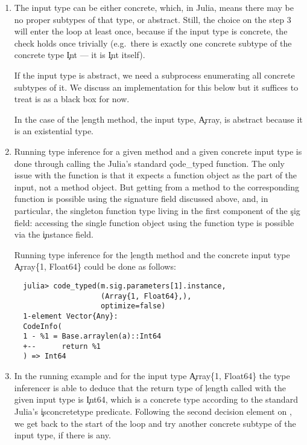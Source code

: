 \begin{enumerate}
  \item The input type can be either concrete, which, in Julia, means there may
  be no proper subtypes of that type, or abstract. Still, the choice on the
  step 3 will enter the loop at least once, because if the input type is
  concrete, the check holds once trivially (e.g.\ there is exactly one concrete
  subtype of the concrete type \c{Int} --- it is \c{Int} itself).

  If the input type is abstract, we need a subprocess enumerating all concrete
  subtypes of it. We discuss an implementation for this below but it suffices to
  treat is as a black box for now. %

  In the case of the \c{length} method, the input type, \c{Array}, is abstract
  because it is an existential type.

  \item Running type inference for a given method and a given concrete input
  type is done through calling the Julia's standard \c{code\_typed} function.
  The only issue with the function is that it expects a function object as the
  part of the input, not a method object. But getting from a method to the
  corresponding function is possible using the signature field discussed above,
  and, in particular, the singleton function type living in the first component
  of the \c{sig} field: accessing the single function object using the function
  type is possible via the \c{instance} field.

  Running type inference for the \c{length} method and the concrete input type
  \c{Array\{1, Float64\}} could be done as follows:
\begin{verbatim}
  julia> code_typed(m.sig.parameters[1].instance,
                    (Array{1, Float64},),
                    optimize=false)
  1-element Vector{Any}:
  CodeInfo(
  1 - %1 = Base.arraylen(a)::Int64
  +--      return %1
  ) => Int64
\end{verbatim}

  \item In the running example and for the input type \c{Array\{1, Float64\}}
  the type inferencer is able to deduce that the return type of \c{length}
  called with the given input type is \c{Int64}, which is a concrete type
  according to the standard Julia's \c{isconcretetype} predicate.
  Following the second decision element on , we get back to
  the start of the loop and try another concrete subtype of the input type,
  if there is any.
\end{enumerate}

